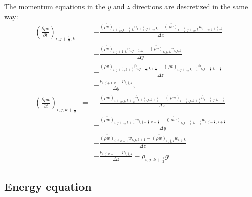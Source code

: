 The momentum equations in the $y$ and $z$ directions are descretized 
in the same way:
\begin{eqnarray}
\left(\frac{\partial \rho v}{\partial t}\right)_{i,j+\frac{1}{2},k}
&=& - \frac{\overline{(\rho v)}_{i+\frac{1}{2},j+\frac{1}{2},k}  \overline{u}_{i+\frac{1}{2},j+\frac{1}{2},k} 
           -\overline{(\rho v)}_{i-\frac{1}{2},j+\frac{1}{2},k}  \overline{u}_{i-\frac{1}{2},j+\frac{1}{2},k}}
     {\Delta x}\nonumber\\
& & - \frac{\overline{(\rho v)}_{i,j+1,k} \overline{v}_{i,j+1,k} 
           -\overline{(\rho v)}_{i,j,k} \overline{v}_{i,j,k}}
     {\Delta y}\nonumber\\
& & - \frac{\overline{(\rho v)}_{i,j+\frac{1}{2},k+\frac{1}{2}}  \overline{v}_{i,j+\frac{1}{2},k+\frac{1}{2}} 
           -\overline{(\rho v)}_{i,j+\frac{1}{2},k-\frac{1}{2}}  \overline{v}_{i,j+\frac{1}{2},k-\frac{1}{2}}}
     {\Delta z}\nonumber\\
& & -\frac{p_{i,j+1,k}-p_{i,j,k}}{\Delta y},\\
\left(\frac{\partial \rho w}{\partial t}\right)_{i,j,k+\frac{1}{2}}
&=& - \frac{\overline{(\rho w)}_{i+\frac{1}{2},j,k+\frac{1}{2}}  \overline{u}_{i+\frac{1}{2},j,k+\frac{1}{2}} 
           -\overline{(\rho w)}_{i-\frac{1}{2},j,k+\frac{1}{2}}  \overline{u}_{i-\frac{1}{2},j,k+\frac{1}{2}}}
     {\Delta x}\nonumber\\
& & - \frac{\overline{(\rho w)}_{i,j+\frac{1}{2},k+\frac{1}{2}}  \overline{w}_{i,j+\frac{1}{2},k+\frac{1}{2}} 
           -\overline{(\rho w)}_{i,j-\frac{1}{2},k+\frac{1}{2}}  \overline{w}_{i,j-\frac{1}{2},k+\frac{1}{2}}}
     {\Delta y}\nonumber\\
& & - \frac{\overline{(\rho w)}_{i,j,k+1} \overline{w}_{i,j,k+1} 
           -\overline{(\rho w)}_{i,j,k} \overline{w}_{i,j,k}}
     {\Delta z}\nonumber\\
& & -\frac{p_{i,j,k+1}-p_{i,j,k}}{\Delta z}-\overline{\rho}_{i,j,k+\frac{1}{2}} g
\end{eqnarray}

\subsection{Energy equation}


